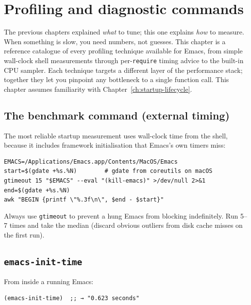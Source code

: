 \chapter{Profiling and diagnostic commands}
\label{ch:profiling}
\minitoc\label{profiling-and-diagnostic-commands}

The previous chapters explained \emph{what} to tune; this one
explains \emph{how} to measure.  When something is slow, you need
numbers, not guesses.  This chapter
is a reference catalogue of every profiling technique available for
Emacs, from simple wall-clock shell measurements through
per-\texttt{require} timing advice to the built-in CPU sampler.  Each
technique targets a different layer of the performance stack; together
they let you pinpoint any bottleneck to a single function call.
This chapter assumes familiarity with Chapter~\ref{ch:startup-lifecycle}.

\section{The benchmark command (external timing)}\label{the-benchmark-command-external-timing}

The most reliable startup measurement uses wall-clock time from the shell, because it includes framework initialisation that Emacs's own timers miss:

\begin{verbatim}
EMACS=/Applications/Emacs.app/Contents/MacOS/Emacs
start=$(gdate +%s.%N)        # gdate from coreutils on macOS
gtimeout 15 "$EMACS" --eval "(kill-emacs)" >/dev/null 2>&1
end=$(gdate +%s.%N)
awk "BEGIN {printf \"%.3f\n\", $end - $start}"
\end{verbatim}

Always use \texttt{gtimeout} to prevent a hung Emacs from blocking indefinitely. Run 5--7 times and take the median (discard obvious outliers from disk cache misses on the first run).

\section{\texttt{emacs-init-time}}\label{emacs-init-time}

From inside a running Emacs:

\begin{verbatim}
(emacs-init-time)  ;; → "0.623 seconds"
\end{verbatim}

